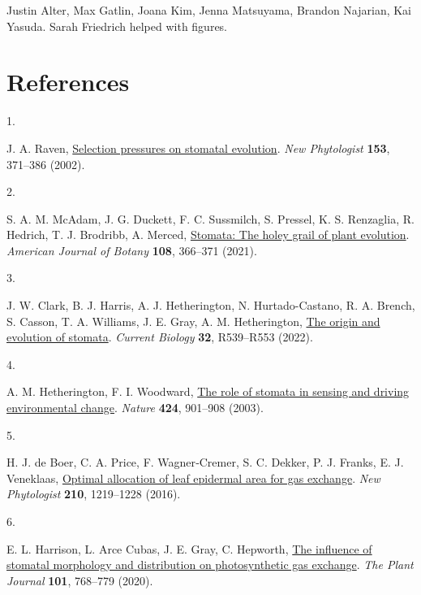 \documentclass[
  letterpaper,
  DIV=11,
  numbers=noendperiod]{scrartcl}
\newlength{\cslhangindent}
\newlength{\csllabelwidth}
\newenvironment{CSLReferences}[2] %
 {\begin{list}{}{%
  \setlength{\itemindent}{0pt}
  \setlength{\leftmargin}{0pt}
  \setlength{\parsep}{0pt}
  \ifodd #1
   \setlength{\leftmargin}{\cslhangindent}
   \setlength{\itemindent}{-1\cslhangindent}
  \fi
  \setlength{\itemsep}{#2\baselineskip}}}
 {\end{list}}
\newcommand{\CSLLeftMargin}[1]{\parbox[t]{\csllabelwidth}{\strut#1\strut}}
\newcommand{\CSLRightInline}[1]{\parbox[t]{\linewidth - \csllabelwidth}{\strut#1\strut}}
\begin{document}
Justin Alter, Max Gatlin, Joana Kim, Jenna Matsuyama, Brandon Najarian,
Kai Yasuda. Sarah Friedrich helped with figures.

\section*{References}\label{references}

\label{refs}
\begin{CSLReferences}{0}{1}
\CSLLeftMargin{1. }%
\CSLRightInline{J. A. Raven,
\href{https://doi.org/10.1046/j.0028-646X.2001.00334.x}{Selection
pressures on stomatal evolution}. \emph{New Phytologist} \textbf{153},
371--386 (2002).}

\CSLLeftMargin{2. }%
\CSLRightInline{S. A. M. McAdam, J. G. Duckett, F. C. Sussmilch, S.
Pressel, K. S. Renzaglia, R. Hedrich, T. J. Brodribb, A. Merced,
\href{https://doi.org/10.1002/ajb2.1619}{Stomata: The holey grail of
plant evolution}. \emph{American Journal of Botany} \textbf{108},
366--371 (2021).}

\CSLLeftMargin{3. }%
\CSLRightInline{J. W. Clark, B. J. Harris, A. J. Hetherington, N.
Hurtado-Castano, R. A. Brench, S. Casson, T. A. Williams, J. E. Gray, A.
M. Hetherington, \href{https://doi.org/10.1016/j.cub.2022.04.040}{The
origin and evolution of stomata}. \emph{Current Biology} \textbf{32},
R539--R553 (2022).}

\CSLLeftMargin{4. }%
\CSLRightInline{A. M. Hetherington, F. I. Woodward,
\href{https://doi.org/10.1038/nature01843}{The role of stomata in
sensing and driving environmental change}. \emph{Nature} \textbf{424},
901--908 (2003).}

\CSLLeftMargin{5. }%
\CSLRightInline{H. J. de Boer, C. A. Price, F. Wagner‐Cremer, S. C.
Dekker, P. J. Franks, E. J. Veneklaas,
\href{https://doi.org/10.1111/nph.13929}{Optimal allocation of leaf
epidermal area for gas exchange}. \emph{New Phytologist} \textbf{210},
1219--1228 (2016).}

\CSLLeftMargin{6. }%
\CSLRightInline{E. L. Harrison, L. Arce Cubas, J. E. Gray, C. Hepworth,
\href{https://doi.org/10.1111/tpj.14560}{The influence of stomatal
morphology and distribution on photosynthetic gas exchange}. \emph{The
Plant Journal} \textbf{101}, 768--779 (2020).}


\end{CSLReferences}
\end{document}
